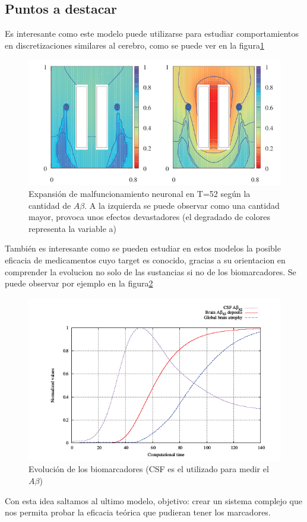 \documentclass[1p]{elsarticle}
\begin{document}
\subsection{Puntos a destacar}
Es interesante como este modelo puede utilizarse para estudiar comportamientos en discretizaciones similares al cerebro, como se puede ver en la figura\ref{cerebro12} 
\begin{figure}
	\includegraphics[scale=0.6]{tercer2.png}
	\caption{Expansión de malfuncionamiento neuronal en T=52 según la cantidad de $A\beta$. A la izquierda se puede observar como una cantidad mayor, provoca unos efectos devastadores (el degradado de colores representa la variable a)  }
	\label{cerebro12}
\end{figure}
También es interesante como se pueden estudiar en estos modelos la posible eficacia de medicamentos cuyo target es conocido, gracias a su orientacion en comprender la evolucion no solo de las sustancias si no de los biomarcadores. Se puede observar por ejemplo en la figura\ref{cerebro26}  
	\begin{figure}
		\includegraphics[scale=0.6]{tercer3.png}
		\caption{Evolución de los biomarcadores (CSF es el utilizado para medir el $A\beta$)}
		\label{cerebro26}
	\end{figure}
Con esta idea saltamos al ultimo modelo, objetivo: crear un sistema complejo que nos permita probar la eficacia teórica que pudieran tener los marcadores.
\end{document}
